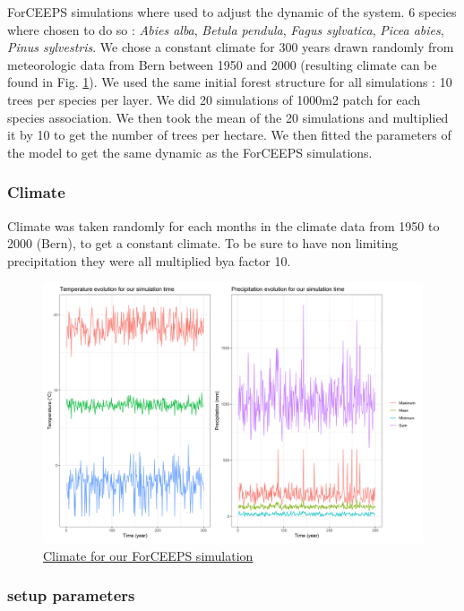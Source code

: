 \documentclass{article}
\begin{document}
ForCEEPS simulations where used to adjust the dynamic of the system. 6 species where chosen to do so : \textit{Abies alba}, \textit{Betula pendula}, \textit{Fagus sylvatica}, \textit{Picea abies}, \textit{Pinus sylvestris}. We chose a constant climate for 300 years drawn randomly from meteorologic data from Bern between 1950 and 2000 (resulting climate can be found in Fig. \ref{fig:climate}). We used the same initial forest structure for all simulations : 10 trees per species per layer. We did 20 simulations of 1000m2 patch for each species association. We then took the mean of the 20 simulations and multiplied it by 10 to get the number of trees per hectare. We then fitted the parameters of the model to get the same dynamic as the ForCEEPS simulations.

\subsubsection{Climate}

Climate was taken randomly for each months in the climate data from 1950 to 2000 (Bern), to get a constant climate. To be sure to have non limiting precipitation they were all multiplied bya factor 10.

\begin{figure}[H]
    \centering
    \includegraphics[width=1\textwidth]{Figure/Parametrisation/Climate_simul.png}
    \caption{\underline{Climate for our ForCEEPS simulation}}
    \label{fig:climate}
\end{figure}

\subsubsection{setup parameters}
\end{document}
